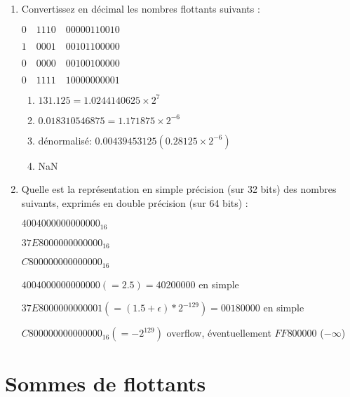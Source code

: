 \documentclass[a4paper,10pt]{exam}
\begin{document}
\begin{enumerate}
\item Convertissez en d\'ecimal les nombres flottants suivants  :

$0\quad 1110\quad 00000110010$

$1\quad 0001\quad 00101100000$

$0\quad 0000\quad 00100100000$

$0\quad 1111\quad 10000000001$

\begin{solution}

\begin{enumerate}
  \item $131.125 = 1.0244140625 \times 2^{7}$
  \item $0.018310546875 = 1.171875 \times 2^{-6}$
  \item dénormalisé: $0.00439453125 (0.28125 \times 2^{-6})$
  \item NaN
\end{enumerate}

\end{solution}

\item Quelle est la repr\'esentation en simple pr\'ecision (sur 32 bits) des nombres suivants, exprim\'es en double pr\'ecision (sur 64 bits) :

$4004000000000000_{16}$

$37E8000000000000_{16}$

$C800000000000000_{16}$

\begin{solution}
$4004000000000000 (= 2.5) = 40200000$ en simple

$37E8000000000001 (= (1.5+\epsilon)*2^{-129}) = 00180000$ en simple

$C800000000000000_{16} (=-2^{129})$ overflow, \'eventuellement $FF800000$ ($-\infty$)

\end{solution}

\end{enumerate}

\pagebreak
\section{Sommes de flottants}
\end{document}
